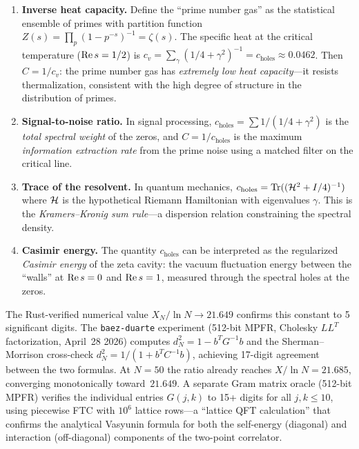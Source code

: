 \documentclass[11pt,a4paper]{article}
\begin{document}
\begin{correspondence}
\label{corr:constant}
\begin{enumerate}
  \item \textbf{Inverse heat capacity.} Define the ``prime number gas''
    as the statistical ensemble of primes with partition function
    $Z(s) = \prod_p (1 - p^{-s})^{-1} = \zeta(s)$. The specific heat
    at the critical temperature ($\operatorname{Re} s = 1/2$) is
    $c_v = \sum_\gamma (1/4 + \gamma^2)^{-1} = c_{\text{holes}} \approx 0.0462$.
    Then $C = 1/c_v$: the prime number gas has \emph{extremely low
    heat capacity}---it resists thermalization, consistent with the
    high degree of structure in the distribution of primes.

  \item \textbf{Signal-to-noise ratio.} In signal processing,
    $c_{\text{holes}} = \sum 1/(1/4 + \gamma^2)$ is the \emph{total
    spectral weight} of the zeros, and $C = 1/c_{\text{holes}}$ is
    the maximum \emph{information extraction rate} from the prime
    noise using a matched filter on the critical line.

  \item \textbf{Trace of the resolvent.} In quantum mechanics,
    $c_{\text{holes}} = \operatorname{Tr}((\mathcal{H}^2 + I/4)^{-1})$ where $\mathcal{H}$ is
    the hypothetical Riemann Hamiltonian with eigenvalues $\gamma$.
    This is the \emph{Kramers--Kronig sum rule}---a dispersion
    relation constraining the spectral density.

  \item \textbf{Casimir energy.} The quantity $c_{\text{holes}}$
    can be interpreted as the regularized \emph{Casimir energy} of
    the zeta cavity: the vacuum fluctuation energy between the
    ``walls'' at $\operatorname{Re} s = 0$ and $\operatorname{Re} s = 1$, measured through the
    spectral holes at the zeros.
\end{enumerate}
\end{correspondence}

The Rust-verified numerical value $X_N / \ln N \to 21.649$ confirms
this constant to 5 significant digits.  The \texttt{baez-duarte}
experiment (512-bit MPFR, Cholesky $LL^T$ factorization, April~28 2026)
computes $d_N^2 = 1 - b^T G^{-1} b$ and the Sherman--Morrison
cross-check $d_N^2 = 1/(1 + b^T C^{-1} b)$, achieving 17-digit
agreement between the two formulas.  At $N = 50$ the ratio already
reaches $X/\ln N = 21.685$, converging monotonically toward~$21.649$.
A separate Gram matrix oracle (512-bit MPFR) verifies the individual
entries $G(j,k)$ to 15+ digits for all $j, k \leq 10$, using
piecewise FTC with $10^6$ lattice rows---a ``lattice QFT
calculation'' that confirms the analytical Vasyunin formula
for both the self-energy (diagonal) and interaction (off-diagonal)
components of the two-point correlator.
\end{document}
